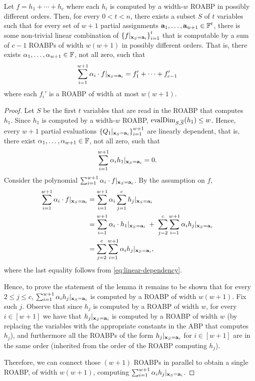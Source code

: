 \documentclass[11pt]{article}
\begin{document}
\begin{lemma}\label{lem:sum-of-ROABP-structure}
Let $f = h_1 + \cdots + h_c$ where each $h_i$ is computed by a width-$w$ ROABP in possibly different orders.
Then, for every $0 < t < n$, there exists a subset $S$ of $t$ variables such that for every set of $w+1$ partial assignments $\veca_1, \ldots, \veca_{w+1} \in \F^{t}$, there is some non-trivial linear combination of $\left\{ f|_{\mathbf{x}_S=\mathbf{a}_i} \right\}_{i=1}^t$ that is computable by a sum of $c-1$ ROABPs of width $w(w+1)$ in possibly different orders.
That is, there exists $\alpha_1, \ldots, \alpha_{w+1} \in \F$, not all zero, such that
\[
\sum_{i=1}^{w+1} \alpha_i \cdot f|_{\mathbf{x}_S = \mathbf{a}_i} = f_1' + \cdots + f_{c-1}'
\]
where each $f_i'$ is a ROABP of width at most $w(w+1)$. 
\end{lemma}

\begin{proof}
Let $S$ be the first $t$ variables that are read in the ROABP that computes $h_1$. Since $h_1$ is computed by a width-$w$ ROABP, $\operatorname{evalDim}_{S, \overline{S}} (h_1) \le w$. Hence, every $w+1$ partial evaluations $\left\{ Q_1|_{\mathbf{x}_S=\mathbf{a}_i} \right\}_{i=1}^{w+1}$ are linearly dependent, that is, there exist  $\alpha_1, \ldots, \alpha_{w+1} \in \F$, not all zero, such that
\begin{equation}
\label{eq:linear-dependency}
\sum_{i=1}^{w+1} \alpha_i h_1|_{\mathbf{x}_S = \mathbf{a}_i} = 0.
\end{equation}
Consider the polynomial $\sum_{i=1}^{w+1} \alpha_i \cdot f|_{\mathbf{x}_S = \mathbf{a}_i}$. By the assumption on $f$,
\begin{align}
\label{eq:sum-of-c-1}
\sum_{i=1}^{w+1} \alpha_i \cdot f|_{\mathbf{x}_S = \mathbf{a}_i} & = \sum_{i=1}^{w+1} \alpha_i \sum_{j=1}^c h_j |_{\mathbf{x}_S = \mathbf{a}_i} \nonumber \\
&= \sum_{i=1}^{w+1} \alpha_i \cdot  h_1|_{\mathbf{x}_S = \mathbf{a}_i} \;+\; \sum_{j=2}^c  \sum_{i=1}^{w+1} \alpha_i h_j |_{\mathbf{x}_S = \mathbf{a}_i} \nonumber \\
&=  \sum_{j=2}^c  \sum_{i=1}^{w+1} \alpha_i h_j |_{\mathbf{x}_S = \mathbf{a}_i},
\end{align}
where the last equality follows from \eqref{eq:linear-dependency}.

Hence, to prove the statement of the lemma it remains to be shown that for every $2 \le j \le c$, $\sum_{i=1}^{w+1} \alpha_i h_j |_{\mathbf{x}_S = \mathbf{a}_i}$ is computed by a ROABP of width $w(w+1)$. Fix such $j$. Observe that since $h_j$ is computed by a ROABP of width $w$, for every $i \in [w+1]$ we have that $h_j |_{\mathbf{x}_S = \mathbf{a}_i}$ is computed by a ROABP of width $w$ (by replacing the variables with the appropriate constants in the ABP that computes $h_j$), and furthermore all the ROABPs of the form $h_j |_{\mathbf{x}_S = \mathbf{a}_i}$ for $i \in [w+1]$ are in the same order (inherited from the order of the ROABP computing $h_j$).

Therefore, we can connect those $(w+1)$ ROABPs in parallel to obtain a single ROABP, of width $w(w+1)$, computing  $\sum_{i=1}^{w+1} \alpha_i h_j |_{\mathbf{x}_S = \mathbf{a}_i}$.
\end{proof}
\end{document}

